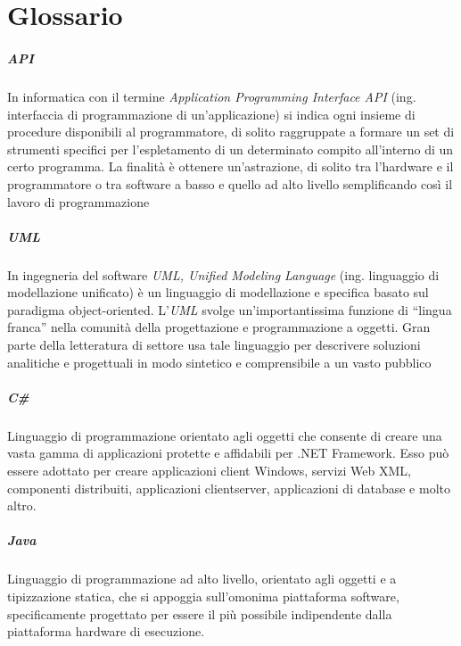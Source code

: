\chapter{Glossario}
\paragraph{API} 
\label{API} 
In informatica con il termine \emph{Application Programming Interface API} (ing. interfaccia di programmazione di un'applicazione) si indica ogni insieme di procedure disponibili al programmatore, di solito raggruppate a formare un set di strumenti specifici per l'espletamento di un determinato compito all'interno di un certo programma. La finalità è ottenere un'astrazione, di solito tra l'hardware e il programmatore o tra software a basso e quello ad alto livello semplificando così il lavoro di programmazione

\paragraph{UML} 
\label{UML} 
In ingegneria del software \emph{UML, Unified Modeling Language} (ing. linguaggio di modellazione unificato) è un linguaggio di modellazione e specifica basato sul paradigma object-oriented. L'\emph{UML} svolge un'importantissima funzione di ``lingua franca'' nella comunità della progettazione e programmazione a oggetti. Gran parte della letteratura di settore usa tale linguaggio per descrivere soluzioni analitiche e progettuali in modo sintetico e comprensibile a un vasto pubblico

\paragraph{C\#}
Linguaggio di programmazione orientato agli oggetti che consente di creare una vasta gamma di applicazioni protette e affidabili per .NET Framework. Esso può essere adottato per creare applicazioni client Windows, servizi Web XML, componenti distribuiti, applicazioni client\-server, applicazioni di database e molto altro.

\paragraph{Java}
Linguaggio di programmazione ad alto livello, orientato agli oggetti e a tipizzazione statica, che si appoggia sull'omonima piattaforma software, specificamente progettato per essere il più possibile indipendente dalla piattaforma hardware di esecuzione.

